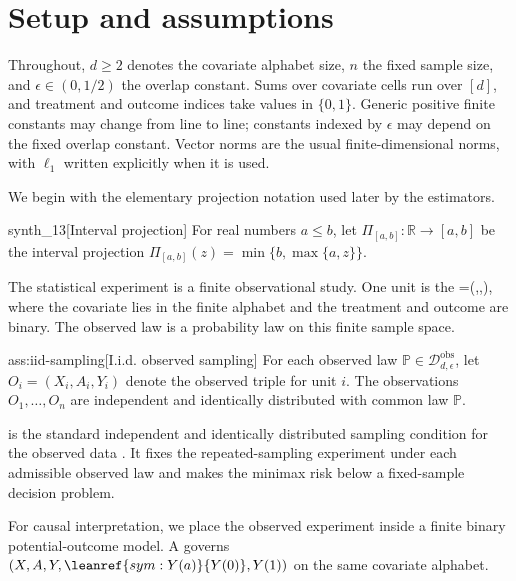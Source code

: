 \section{Setup and assumptions}

Throughout, \(d\geq 2\) denotes the covariate alphabet size, \(n\) the fixed sample size, and \(\epsilon\in(0,1/2)\) the overlap constant. Sums over covariate cells run over \([d]\), and treatment and outcome indices take values in \(\{0,1\}\). Generic positive finite constants may change from line to line; constants indexed by \(\epsilon\) may depend on the fixed overlap constant. Vector norms are the usual finite-dimensional norms, with \(\ell_1\) written explicitly when it is used.

We begin with the elementary projection notation used later by the estimators.

\begin{definitionv}{synth_13}[Interval projection]
For real numbers \(a\leq b\), let \(\Pi_{[a,b]}:\mathbb R\to [a,b]\) be the interval projection \(\Pi_{[a,b]}(z)=\min\{b,\max\{a,z\}\}\).
\end{definitionv}

The statistical experiment is a finite observational study. One unit is the  =(,,), where the covariate lies in the finite alphabet  and the treatment and outcome are binary. The observed law  is a probability law on this finite sample space.

\begin{assumptionv}{ass:iid-sampling}[I.i.d. observed sampling]
For each observed law \(\mathbb P\in\mathcal D_{d,\epsilon}^{\mathrm{obs}}\), let \(O_i=(X_i,A_i,Y_i)\) denote the observed triple for unit \(i\). The observations \(O_1,\ldots,O_n\) are independent and identically distributed with common law \(\mathbb P\).
\end{assumptionv}

 is the standard independent and identically distributed sampling condition for the observed data \citep{ZengBalakrishnanHanKennedy2024Discrete}. It fixes the repeated-sampling experiment under each admissible observed law and makes the minimax risk below a fixed-sample decision problem.

For causal interpretation, we place the observed experiment inside a finite binary potential-outcome model. A   governs \((X,A,Y,\leanref{sym:Y(a)}{\ensuremath{Y(0)}},Y(1))\) on the same covariate alphabet.

